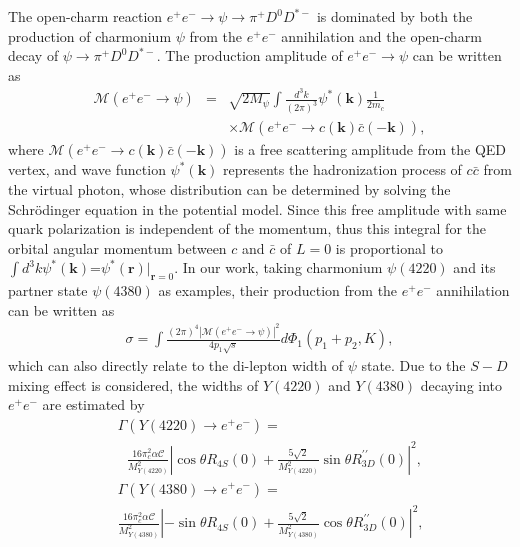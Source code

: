 \documentclass[final,5p,times,twocolumn]{elsarticle}
\begin{document}
The open-charm reaction $e^+e^- \to \psi \to \pi^+D^0D^{*-}$ is dominated by both the production of charmonium $\psi$ from the $e^+e^-$ annihilation and the open-charm decay of $\psi \to \pi^+D^0D^{*-}$.
The production amplitude of $e^+e^- \to \psi$ can be written as 
\begin{eqnarray}
\mathcal{M}(e^+e^- \to \psi)&=&\sqrt{2M_{\psi}}\int\frac{d^3k}{(2\pi)^3}\psi^*(\mathbf{k})\frac{1}{2m_c} \nonumber \\
&&\times \mathcal{M}(e^+e^- \to c(\mathbf{k})\bar{c}(-\mathbf{k})),
\end{eqnarray}
where $\mathcal{M}(e^+e^- \to c(\mathbf{k})\bar{c}(-\mathbf{k}))$ is a free scattering amplitude from the QED vertex, and wave function $\psi^*(\mathbf{k})$ represents the hadronization process of $c\bar{c}$ { from the virtual photon, whose distribution can be determined by solving the Schr\"{o}dinger equation in the potential model.} Since this free amplitude with same quark polarization is independent of the momentum, thus this integral for the orbital angular momentum between $c$ and $\bar{c}$ of $L=0$ is proportional to $\int d^3k \psi^*(\mathbf{k})$=$\psi^*(\mathbf{r})|_{\mathbf{r}=0}$. In our work, taking charmonium $\psi(4220)$ and its partner state $\psi(4380)$ as examples, their production from the $e^+e^-$ annihilation can be written as
\begin{eqnarray}
\sigma=\int\frac{(2\pi)^4|\mathcal{M}(e^+e^- \to \psi)|^2}{4p_1\sqrt{s}}d\Phi_1(p_1+p_2,K),
\end{eqnarray}
which can also directly relate to the di-lepton width of $\psi$ state. Due to the $S-D$ mixing effect is considered, the widths of $Y(4220)$ and $Y(4380)$ decaying into $e^+e^-$ are estimated by 
\begin{eqnarray}
&&\Gamma(Y(4220)\to e^+e^-)= \nonumber \\ &&~~~\frac{16\pi_c^2\alpha\mathcal{C}}{M^2_{Y(4220)}}\left|\cos\theta R_{4S}(0)+\frac{5\sqrt{2}}{M^2_{Y(4220)}}\sin\theta R^{\prime\prime}_{3D}(0)\right|^2, \\
&&\Gamma(Y(4380)\to e^+e^-)=  \nonumber \\ &&\frac{16\pi_c^2\alpha\mathcal{C}}{M^2_{Y(4380)}}\left|-\sin\theta R_{4S}(0)+\frac{5\sqrt{2}}{M^2_{Y(4380)}}\cos\theta R^{\prime\prime}_{3D}(0)\right|^2, 
\end{eqnarray}
\end{document}
